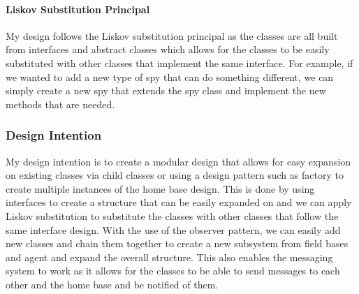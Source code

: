 \documentclass[12pt]{article}
\begin{document}
        \subsection*{Liskov Substitution Principal}
            My design follows the Liskov substitution principal as the classes are all built from interfaces and abstract classes
            which allows for the classes to be easily substituted with other classes that implement the same interface. 
            For example, if we wanted to add a new type of spy that can do something different, we can simply create a 
            new spy that extends the spy class and implement the new methods that are needed.

    \section{Design Intention}
        My design intention is to create a modular design that allows for easy expansion on existing classes via child classes or using 
        a design pattern such as factory to create multiple instances of the home base design. This is done by using interfaces
        to create a structure that can be easily expanded on and we can apply Liskov substitution to substitute the classes with other classes
        that follow the same interface design. With the use of the observer pattern, we can easily add new classes and chain them together to create a new 
        subsystem from field bases and agent and expand the overall structure. This also enables the messaging system to work as it allows for the classes to
         be able to send messages to each other and the home base and be notified of them. 

    \part{}
        
\end{document}
